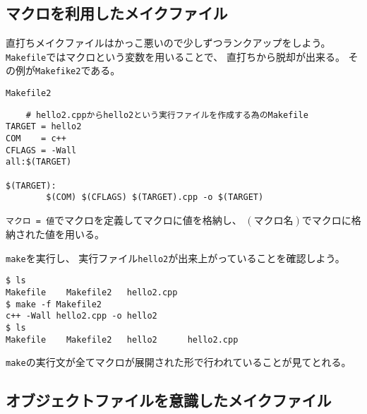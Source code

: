 \clearpage
 \subsection{マクロを利用したメイクファイル}
 直打ちメイクファイルはかっこ悪いので少しずつランクアップをしよう。
 \texttt{Makefile}ではマクロという変数を用いることで、
 直打ちから脱却が出来る。
 その例が\texttt{Makefike2}である。
\begin{itembox}{\texttt{Makefile2}}
 \begin{verbatim}
	# hello2.cppからhello2という実行ファイルを作成する為のMakefile
TARGET = hello2
COM    = c++
CFLAGS = -Wall
all:$(TARGET)

$(TARGET):
        $(COM) $(CFLAGS) $(TARGET).cpp -o $(TARGET)
 \end{verbatim}
\end{itembox}
\texttt{マクロ = 値}でマクロを定義してマクロに値を格納し、
\texttt{$(マクロ名)$}でマクロに格納された値を用いる。

\verb|make|を実行し、
実行ファイル\texttt{hello2}が出来上がっていることを確認しよう。
\begin{verbatim}
$ ls
Makefile	Makefile2	hello2.cpp
$ make -f Makefile2
c++ -Wall hello2.cpp -o hello2
$ ls
Makefile	Makefile2	hello2		hello2.cpp
\end{verbatim}
\verb|make|の実行文が全てマクロが展開された形で行われていることが見てとれる。


\subsection{オブジェクトファイルを意識したメイクファイル}